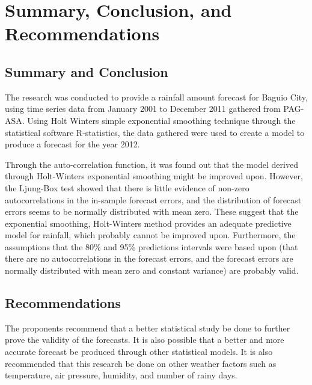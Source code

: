\chapter{Summary, Conclusion, and Recommendations}

\section*{Summary and Conclusion}

The research was conducted to provide a rainfall amount forecast for Baguio City, using time series data from January 2001 to December 2011 gathered from PAG-ASA. 
Using Holt Winters simple exponential smoothing technique through the statistical software R-statistics, the data gathered were used to create a model to produce a forecast for the year 2012. 

Through the auto-correlation function, it was found out that the model derived through Holt-Winters exponential smoothing might be improved upon. However, the Ljung-Box test showed that there is little evidence of non-zero autocorrelations in the in-sample forecast
errors, and the distribution of forecast errors seems to be normally distributed with mean zero. These suggest
that the exponential smoothing, Holt-Winters method provides an adequate predictive model for  rainfall, which
probably cannot be improved upon. Furthermore, the assumptions that the 80\% and 95\% predictions intervals
were based upon (that there are no autocorrelations in the forecast errors, and the forecast errors are normally
distributed with mean zero and constant variance) are probably valid.


\section*{Recommendations}
The proponents recommend that a better statistical study be done to further prove the validity of the forecasts. It is also possible that a better and more accurate forecast be produced through other statistical models. It is also recommended that this research be done on other weather factors such as temperature, air pressure, humidity, and number of rainy days.
